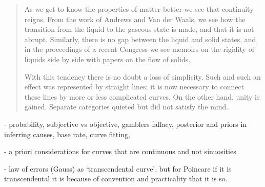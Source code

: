  \begin{quote}
     As we get to know the properties of matter better we see that continuity reigns.  From the work of Andrews and Van der Waals, we see how the transition from the liquid to the gaseous state is made, and that it is not abrupt.  Similarly, there is no gap between the liquid and solid states, and in the proceedings of a recent Congress we see memoirs on the rigidity of liquids side by side with papers on the flow of solids.  
     
     With this tendency there is no doubt a loss of simplicity.  Such and such an effect was represented by straight lines; it is now necessary to connect these lines by more or less complicated curves.  On the other hand, unity is gained.  Separate categories quieted but did not satisfy the mind.  
     
     \citep[p. 181-182]{Poincare1952}
 \end{quote}
 
 - probability, subjective vs objective, gamblers fallacy, posterior and priors in inferring causes, base rate, curve fitting, 
 
 - a priori considerations for curves that are continuous and not sinuosities
 
 - law of errors (Gauss) as `transcendental curve', but for Poincare if it is transcendental it is because of convention and practicality that it is so.
 
